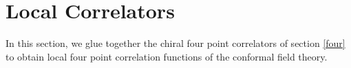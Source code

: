 \documentclass[12pt]{article}
\numberwithin{equation}{section}
\numberwithin{equation}{section}
\numberwithin{table}{section}\setlength{\multlinegap}{25pt}
\begin{document}




\section{Local Correlators}
\label{local}
In this section, we glue together the chiral four point correlators of section \ref{four} to obtain local
four point correlation functions of the conformal field theory. 
\end{document}
